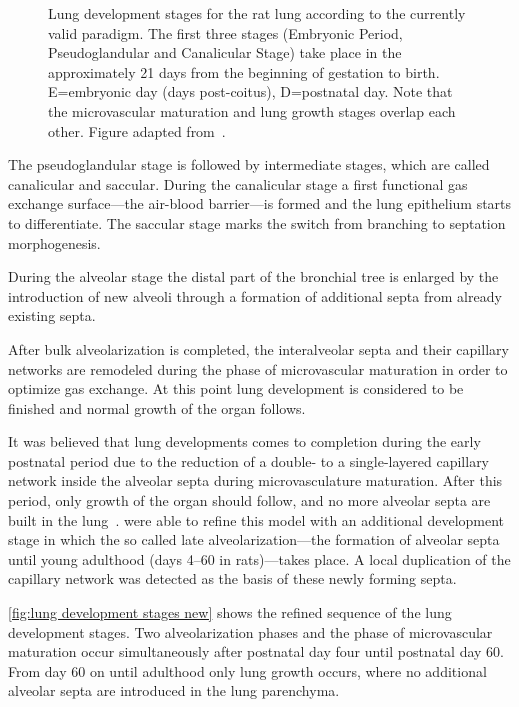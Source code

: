 \begin{figure}
	\noindent\makebox[\textwidth]{%
		\centering%
		}%
	\caption[Lung development stages]{Lung development stages for the rat lung according to the currently valid paradigm. The first three stages (Embryonic Period, Pseudoglandular and Canalicular Stage) take place in the approximately 21 days from the beginning of gestation to birth. E=embryonic day (days post-coitus), D=postnatal day. Note that the microvascular maturation and lung growth stages overlap each other. Figure adapted from~\cite{Schittny2007a}.}
	\label{fig:lung development stages old}
\end{figure}

The pseudoglandular stage is followed by intermediate stages, which are called canalicular and saccular. During the canalicular stage a first functional gas exchange surface---the air-blood barrier---is formed and the lung epithelium starts to differentiate. The saccular stage marks the switch from branching to septation morphogenesis.

During the alveolar stage the distal part of the bronchial tree is enlarged by the introduction of new alveoli through a formation of additional septa from already existing septa. 

After bulk alveolarization is completed, the interalveolar septa and their capillary networks are remodeled during the phase of microvascular maturation in order to optimize gas exchange. At this point lung development is considered to be finished and normal growth of the organ follows.

It was believed that lung developments comes to completion during the early postnatal period due to the reduction of a double- to a single-layered capillary network inside the alveolar septa during microvasculature maturation. After this period, only growth of the organ should follow, and no more alveolar septa are built in the lung~\cite{Burri1999,Schittny2004}. \citet{Schittny2008} were able to refine this model with an additional development stage in which the so called late alveolarization---the formation of alveolar septa until young adulthood (days 4--60 in rats)---takes place. A local duplication of the capillary network was detected as the basis of these newly forming septa.

\autoref{fig:lung development stages new} shows the refined sequence of the lung development stages. Two alveolarization phases and the phase of microvascular maturation occur simultaneously after postnatal day four until postnatal day 60. From day 60 on until adulthood only lung growth occurs, where no additional alveolar septa are introduced in the lung parenchyma.

